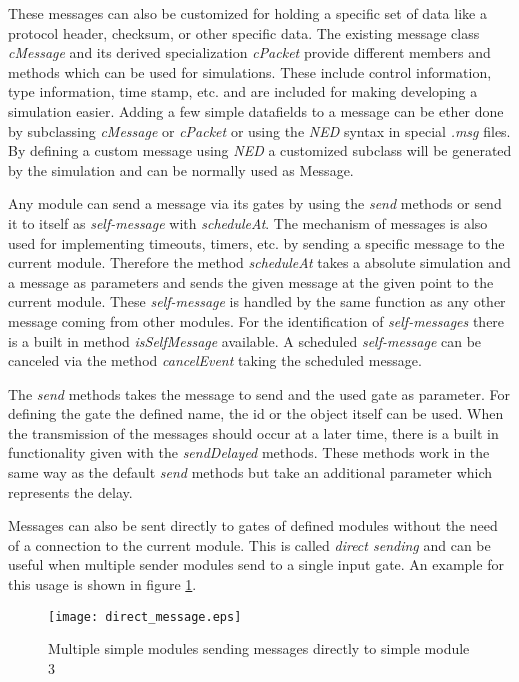 These messages can also be customized for holding a specific set of data like a protocol header, checksum, or other specific data.
The existing message class \emph{cMessage} and its derived specialization \emph{cPacket} provide different members and methods which can be used for simulations.
These include control information, type information, time stamp, etc. and are included for making developing a simulation easier.
Adding a few simple datafields to a message can be ether done by subclassing \emph{cMessage} or \emph{cPacket} or using the \emph{NED} syntax in special \emph{.msg} files.
By defining a custom message using \emph{NED} a customized subclass will be generated by the simulation and can be normally used as Message. \cite[chapter 6]{omnet_manual}

Any module can send a message via its gates by using the \emph{send} methods or send it to itself as \emph{self-message} with \emph{scheduleAt}.
The mechanism of messages is also used for implementing timeouts, timers, etc. by sending a specific message to the current module.
Therefore the method \emph{scheduleAt} takes a absolute simulation and a message as parameters and sends the given message at the given point to the current module.
These \emph{self-message} is handled by the same function as any other message coming from other modules.
For the identification of \emph{self-messages} there is a built in method \emph{isSelfMessage} available.
A scheduled \emph{self-message} can be canceled via the method \emph{cancelEvent} taking the scheduled message. \cite[section 4.7.1]{omnet_manual}

The \emph{send} methods takes the message to send and the used gate as parameter.
For defining the gate the defined name, the id or the object itself can be used. \cite[section 4.7.2]{omnet_manual}
When the transmission of the messages should occur at a later time, there is a built in functionality given with the \emph{sendDelayed} methods.
These methods work in the same way as the default \emph{send} methods but take an additional parameter which represents the delay. \cite[section 4.7.6]{omnet_manual}

Messages can also be sent directly to gates of defined modules without the need of a connection to the current module.
This is called \emph{direct sending} and can be useful when multiple sender modules send to a single input gate.
An example for this usage is shown in figure \ref{fig:direct_sending}.

\begin{figure}
        \centering
        \texttt{[image: direct\_message.eps]}
        \caption{Multiple simple modules sending messages directly to simple module 3}
        \label{fig:direct_sending}
\end{figure}

